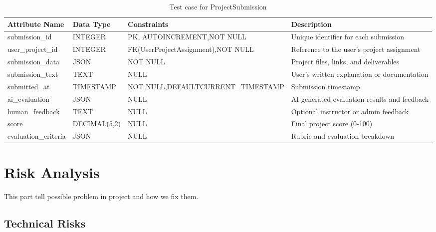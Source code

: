 \documentclass{FastFyp}
\begin{document}
\begin{samepage}


\begin{table}[H]
\footnotesize
\centering
\caption{Test case for ProjectSubmission}
\begin{tabular}{|p{3cm}|p{2.3cm}|p{3.8cm}|p{4.4cm}|}
\hline
Attribute Name & Data Type & Constraints & Description \\ \hline
submission\_id & INTEGER & PK, AUTO\newline INCREMENT,\newline NOT NULL & Unique identifier for each submission \\ \hline
user\_project\_id & INTEGER & FK(UserProjectAssignment),\newline NOT NULL & Reference to the user's project assignment \\ \hline
submission\_data & JSON & NOT NULL & Project files, links, and deliverables \\ \hline
submission\_text & TEXT & NULL & User's written explanation or documentation \\ \hline
submitted\_at & TIMESTAMP & NOT NULL,\newline DEFAULT\newline CURRENT\_TIMESTAMP & Submission timestamp \\ \hline
ai\_evaluation & JSON & NULL & AI-generated evaluation results and feedback \\ \hline
human\_feedback & TEXT & NULL & Optional instructor or admin feedback \\ \hline
score & DECIMAL(5,2) & NULL & Final project score (0-100) \\ \hline
evaluation\_criteria & JSON & NULL & Rubric and evaluation breakdown \\ \hline
\end{tabular}
\end{table}
\end{samepage}

\section{Risk Analysis}

This part tell possible problem in project and how we fix them.

\subsection{Technical Risks}
\end{document}
